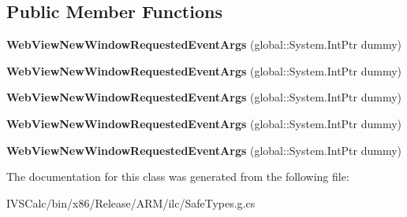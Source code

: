 \subsection*{Public Member Functions}
\begin{DoxyCompactItemize}
\item 
\mbox{\label{class_windows_1_1_u_i_1_1_xaml_1_1_controls_1_1_web_view_new_window_requested_event_args_a50a0f67cb7f37bc707ad486e38856f9c}} 
{\bfseries Web\+View\+New\+Window\+Requested\+Event\+Args} (global\+::\+System.\+Int\+Ptr dummy)
\item 
\mbox{\label{class_windows_1_1_u_i_1_1_xaml_1_1_controls_1_1_web_view_new_window_requested_event_args_a50a0f67cb7f37bc707ad486e38856f9c}} 
{\bfseries Web\+View\+New\+Window\+Requested\+Event\+Args} (global\+::\+System.\+Int\+Ptr dummy)
\item 
\mbox{\label{class_windows_1_1_u_i_1_1_xaml_1_1_controls_1_1_web_view_new_window_requested_event_args_a50a0f67cb7f37bc707ad486e38856f9c}} 
{\bfseries Web\+View\+New\+Window\+Requested\+Event\+Args} (global\+::\+System.\+Int\+Ptr dummy)
\item 
\mbox{\label{class_windows_1_1_u_i_1_1_xaml_1_1_controls_1_1_web_view_new_window_requested_event_args_a50a0f67cb7f37bc707ad486e38856f9c}} 
{\bfseries Web\+View\+New\+Window\+Requested\+Event\+Args} (global\+::\+System.\+Int\+Ptr dummy)
\item 
\mbox{\label{class_windows_1_1_u_i_1_1_xaml_1_1_controls_1_1_web_view_new_window_requested_event_args_a50a0f67cb7f37bc707ad486e38856f9c}} 
{\bfseries Web\+View\+New\+Window\+Requested\+Event\+Args} (global\+::\+System.\+Int\+Ptr dummy)
\end{DoxyCompactItemize}


The documentation for this class was generated from the following file\+:\begin{DoxyCompactItemize}
\item 
I\+V\+S\+Calc/bin/x86/\+Release/\+A\+R\+M/ilc/Safe\+Types.\+g.\+cs\end{DoxyCompactItemize}
